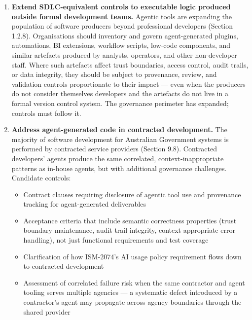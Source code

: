 \documentclass[a4paper,11pt]{report}
\providecommand{\tightlist}{%
  \setlength{\itemsep}{0pt}\setlength{\parskip}{0pt}}
\begin{document}
\begin{enumerate}
  \begin{itemize}
  \tightlist
  \item
    Validate the feasibility finding against a broader set of codebases
    and programming languages
  \item
    Evaluate whether automated enforcement meaningfully reduces defect
    escape rates in practice
  \item
    Develop criteria for assessing the assurance properties of
    enforcement tools themselves (Appendix B, Section B.5)
  \end{itemize}
\item
  \textbf{Extend SDLC-equivalent controls to executable logic produced
  outside formal development teams.} Agentic tools are expanding the
  population of software producers beyond professional developers
  (Section 1.2.8). Organisations should inventory and govern
  agent-generated plugins, automations, BI extensions, workflow scripts,
  low-code components, and similar artefacts produced by analysts,
  operators, and other non-developer staff. Where such artefacts affect
  trust boundaries, access control, audit trails, or data integrity,
  they should be subject to provenance, review, and validation controls
  proportionate to their impact --- even when the producers do not
  consider themselves developers and the artefacts do not live in a
  formal version control system. The governance perimeter has expanded;
  controls must follow it.
\item
  \textbf{Address agent-generated code in contracted development.} The
  majority of software development for Australian Government systems is
  performed by contracted service providers (Section 9.8). Contracted
  developers' agents produce the same correlated, context-inappropriate
  patterns as in-house agents, but with additional governance
  challenges. Candidate controls:

  \begin{itemize}
  \tightlist
  \item
    Contract clauses requiring disclosure of agentic tool use and
    provenance tracking for agent-generated deliverables
  \item
    Acceptance criteria that include semantic correctness properties
    (trust boundary maintenance, audit trail integrity,
    context-appropriate error handling), not just functional
    requirements and test coverage
  \item
    Clarification of how ISM-2074's AI usage policy requirement flows
    down to contracted development
  \item
    Assessment of correlated failure risk when the same contractor and
    agent tooling serves multiple agencies --- a systematic defect
    introduced by a contractor's agent may propagate across agency
    boundaries through the shared provider
  \end{itemize}
\end{enumerate}
\end{document}
